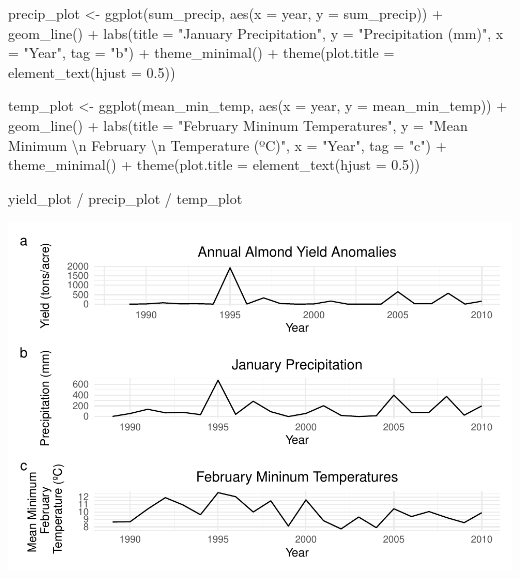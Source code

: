 \documentclass[
]{article}
\newenvironment{Shaded}{\begin{snugshade}}{\end{snugshade}}
\newcommand{\AttributeTok}[1]{\textcolor[rgb]{0.77,0.63,0.00}{#1}}
\newcommand{\FloatTok}[1]{\textcolor[rgb]{0.00,0.00,0.81}{#1}}
\newcommand{\FunctionTok}[1]{\textcolor[rgb]{0.00,0.00,0.00}{#1}}
\newcommand{\NormalTok}[1]{#1}
\newcommand{\OtherTok}[1]{\textcolor[rgb]{0.56,0.35,0.01}{#1}}
\newcommand{\SpecialCharTok}[1]{\textcolor[rgb]{0.00,0.00,0.00}{#1}}
\newcommand{\StringTok}[1]{\textcolor[rgb]{0.31,0.60,0.02}{#1}}
\begin{document}
\begin{Shaded}
\begin{Highlighting}[]
\NormalTok{precip\_plot }\OtherTok{\textless{}{-}} \FunctionTok{ggplot}\NormalTok{(sum\_precip, }\FunctionTok{aes}\NormalTok{(}\AttributeTok{x =}\NormalTok{ year, }\AttributeTok{y =}\NormalTok{ sum\_precip)) }\SpecialCharTok{+}
  \FunctionTok{geom\_line}\NormalTok{() }\SpecialCharTok{+}
  \FunctionTok{labs}\NormalTok{(}\AttributeTok{title =} \StringTok{"January Precipitation"}\NormalTok{, }\AttributeTok{y =} \StringTok{"Precipitation (mm)"}\NormalTok{, }\AttributeTok{x =} \StringTok{"Year"}\NormalTok{, }\AttributeTok{tag =} \StringTok{"b"}\NormalTok{) }\SpecialCharTok{+}
  \FunctionTok{theme\_minimal}\NormalTok{() }\SpecialCharTok{+}
  \FunctionTok{theme}\NormalTok{(}\AttributeTok{plot.title =} \FunctionTok{element\_text}\NormalTok{(}\AttributeTok{hjust =} \FloatTok{0.5}\NormalTok{))}

\NormalTok{temp\_plot }\OtherTok{\textless{}{-}} \FunctionTok{ggplot}\NormalTok{(mean\_min\_temp, }\FunctionTok{aes}\NormalTok{(}\AttributeTok{x =}\NormalTok{ year, }\AttributeTok{y =}\NormalTok{ mean\_min\_temp)) }\SpecialCharTok{+}
  \FunctionTok{geom\_line}\NormalTok{() }\SpecialCharTok{+}
  \FunctionTok{labs}\NormalTok{(}\AttributeTok{title =} \StringTok{"February Mininum Temperatures"}\NormalTok{, }\AttributeTok{y =} \StringTok{"Mean Minimum }\SpecialCharTok{\textbackslash{}n}\StringTok{ February }\SpecialCharTok{\textbackslash{}n}\StringTok{ Temperature (ºC)"}\NormalTok{, }\AttributeTok{x =} \StringTok{"Year"}\NormalTok{, }\AttributeTok{tag =} \StringTok{"c"}\NormalTok{) }\SpecialCharTok{+}
  \FunctionTok{theme\_minimal}\NormalTok{() }\SpecialCharTok{+}
  \FunctionTok{theme}\NormalTok{(}\AttributeTok{plot.title =} \FunctionTok{element\_text}\NormalTok{(}\AttributeTok{hjust =} \FloatTok{0.5}\NormalTok{))}
\end{Highlighting}
\end{Shaded}

\begin{Shaded}
\begin{Highlighting}[]
\NormalTok{yield\_plot }\SpecialCharTok{/}\NormalTok{ precip\_plot }\SpecialCharTok{/}\NormalTok{ temp\_plot}
\end{Highlighting}
\end{Shaded}

\includegraphics{assignment2_almond_files/figure-latex/unnamed-chunk-6-1.pdf}
\end{document}
